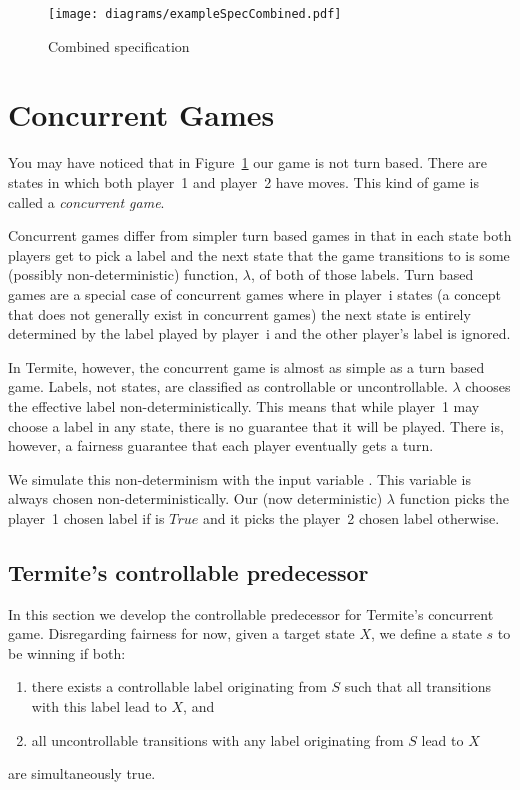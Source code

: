 \begin{figure}
\centering
\texttt{[image: diagrams/exampleSpecCombined.pdf]}
\caption{Combined specification}
\label{fig:combined_spec}
\end{figure}

\section{Concurrent Games}
\label{sec:conc_games}

You may have noticed that in Figure~\ref{fig:combined_spec} our game is not turn based. There are states in which both player~1 and player~2 have moves. This kind of game is called a \emph{concurrent game}.

Concurrent games differ from simpler turn based games in that in each state both players get to pick a label and the next state that the game transitions to is some (possibly non-deterministic) function, $\lambda$, of both of those labels. Turn based games are a special case of concurrent games where in player~i states (a concept that does not generally exist in concurrent games) the next state is entirely determined by the label played by player~i and the other player's label is ignored. 

In Termite, however, the concurrent game is almost as simple as a turn based game. Labels, not states, are classified as controllable or uncontrollable. $\lambda$ chooses the effective label non-deterministically. This means that while player~1 may choose a label in any state, there is no guarantee that it will be played. There is, however, a fairness guarantee that each player eventually gets a turn.

We simulate this non-determinism with the input variable . This variable is always chosen non-deterministically. Our (now deterministic) $\lambda$ function picks the player~1 chosen label if  is $True$ and it picks the player~2 chosen label otherwise.

\subsection{Termite's controllable predecessor}

In this section we develop the controllable predecessor for Termite's concurrent game. Disregarding fairness for now, given a target state $X$, we define a state $s$ to be winning if both:
\begin{enumerate}
    \item there exists a controllable label originating from $S$ such that all transitions with this label lead to $X$, and
    \item all uncontrollable transitions with any label originating from $S$ lead to $X$
\end{enumerate}
\noindent are simultaneously true. 

